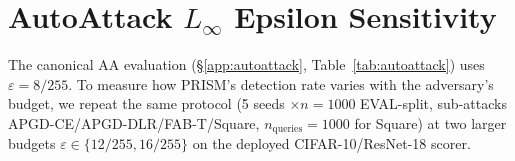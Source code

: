 
\section{AutoAttack \texorpdfstring{$L_\infty$}{L-infinity} Epsilon Sensitivity}
\label{app:aa_eps_sweep}

The canonical AA evaluation (\S\ref{app:autoattack}, Table~\ref{tab:autoattack})
uses $\varepsilon{=}8/255$. To measure how PRISM's detection rate varies with
the adversary's budget, we repeat the same protocol (5 seeds $\times n{=}1000$
EVAL-split, sub-attacks APGD-CE/APGD-DLR/FAB-T/Square,
$n_\text{queries}{=}1000$ for Square) at two larger budgets
$\varepsilon \in \{12/255, 16/255\}$ on the deployed CIFAR-10/ResNet-18 scorer.

